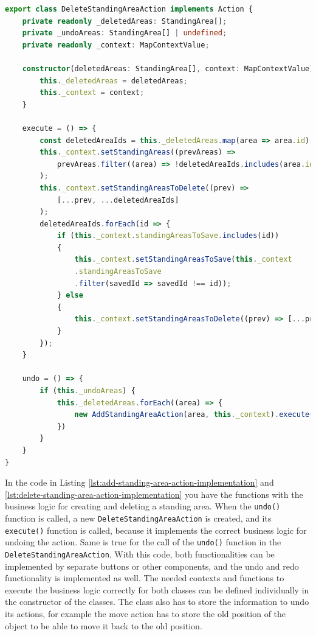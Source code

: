 \begin{lstlisting}[language=TypeScript,caption={Delete standing-area action implementation},label={lst:delete-standing-area-action-implementation}]
export class DeleteStandingAreaAction implements Action {
    private readonly _deletedAreas: StandingArea[];
    private _undoAreas: StandingArea[] | undefined;
    private readonly _context: MapContextValue;

    constructor(deletedAreas: StandingArea[], context: MapContextValue) {
        this._deletedAreas = deletedAreas;
        this._context = context;
    }

    execute = () => {
        const deletedAreaIds = this._deletedAreas.map(area => area.id);
        this._context.setStandingAreas((prevAreas) =>
            prevAreas.filter((area) => !deletedAreaIds.includes(area.id))
        );
        this._context.setStandingAreasToDelete((prev) => 
            [...prev, ...deletedAreaIds]
        );
        deletedAreaIds.forEach(id => {
            if (this._context.standingAreasToSave.includes(id)) 
            {
                this._context.setStandingAreasToSave(this._context
                .standingAreasToSave
                .filter(savedId => savedId !== id));
            } else 
            {
                this._context.setStandingAreasToDelete((prev) => [...prev, id]);
            }
        });
    }

    undo = () => {
        if (this._undoAreas) {
            this._deletedAreas.forEach((area) => {
                new AddStandingAreaAction(area, this._context).execute()
            })
        }
    }
}
\end{lstlisting}

In the code in Listing \ref{lst:add-standing-area-action-implementation} and \ref{lst:delete-standing-area-action-implementation} you have the functions with the business logic for creating and deleting a standing area. When the \texttt{undo()} function is called, a new \texttt{DeleteStandingAreaAction} is created, and its \texttt{execute()} function is called, because it implements the correct business logic for undoing the action. Same is true for the call of the \texttt{undo()} function in the \texttt{DeleteStandingAreaAction}. With this code, both functionalities can be implemented by separate buttons or other components, and the undo and redo functionality is implemented as well. The needed contexts and functions to execute the business logic correctly for both classes can be defined individually in the constructor of the classes. The class also has to store the information to undo its actions, for example the move action has to store the old position of the object to be able to move it back to the old position.

